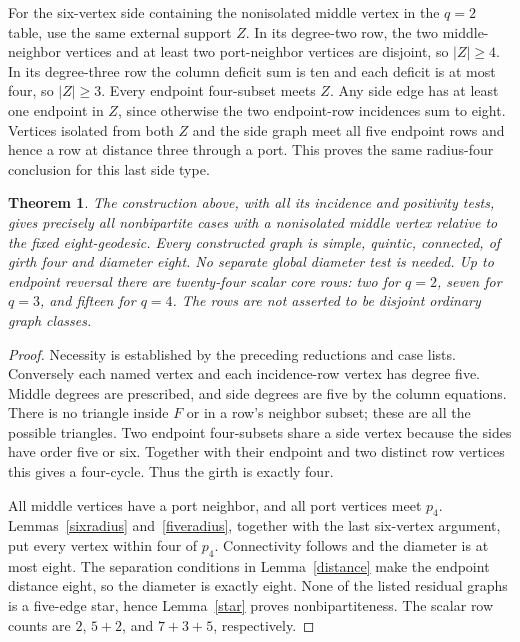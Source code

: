 \documentclass[11pt]{article}
\newtheorem{theorem}{Theorem}
\begin{document}
For the six-vertex side containing the nonisolated middle vertex in the
$q=2$ table, use the same external support $Z$. In its degree-two row,
the two middle-neighbor vertices and at least two port-neighbor vertices
are disjoint, so $|Z|\geq4$. In its degree-three row the column deficit
sum is ten and each deficit is at most four, so $|Z|\geq3$.
Every endpoint four-subset meets $Z$. Any side edge has at least one
endpoint in $Z$, since otherwise the two endpoint-row incidences sum
to eight. Vertices isolated from both $Z$ and the side graph meet all
five endpoint rows and hence a row at distance three through a port.
This proves the same radius-four conclusion for this last side type.

\begin{theorem}\label{construction}
The construction above, with all its incidence and positivity tests,
gives precisely all nonbipartite cases with a nonisolated middle vertex
relative to the fixed eight-geodesic. Every constructed graph is simple,
quintic, connected, of girth four and diameter eight. No separate global
diameter test is needed. Up to endpoint reversal there are twenty-four
scalar core rows: two for $q=2$, seven for $q=3$, and fifteen for $q=4$.
The rows are not asserted to be disjoint ordinary graph classes.
\end{theorem}
\begin{proof}
Necessity is established by the preceding reductions and case lists.
Conversely each named vertex and each incidence-row vertex has degree
five. Middle degrees are prescribed, and side degrees are five by the
column equations. There is no triangle inside $F$ or in a row's
neighbor subset; these are all the possible triangles. Two endpoint
four-subsets share a side vertex because the sides have order five or
six. Together with their endpoint and two distinct row vertices this
gives a four-cycle. Thus the girth is exactly four.

All middle vertices have a port neighbor, and all port vertices meet
$p_4$. Lemmas~\ref{sixradius} and~\ref{fiveradius}, together with the
last six-vertex argument, put every vertex within four of $p_4$.
Connectivity follows and the diameter is at most eight. The separation
conditions in Lemma~\ref{distance} make the endpoint distance eight,
so the diameter is exactly eight. None of the listed residual graphs
is a five-edge star, hence Lemma~\ref{star} proves nonbipartiteness.
The scalar row counts are $2$, $5+2$, and $7+3+5$, respectively.
\end{proof}
\end{document}
